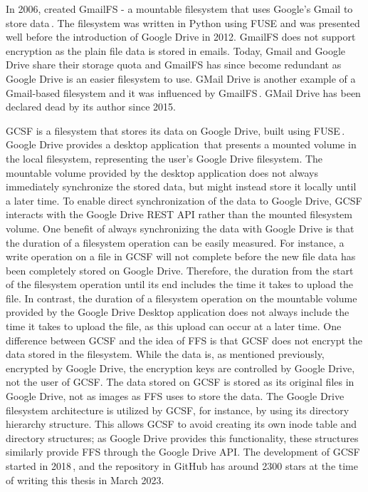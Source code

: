 In 2006, \citeauthor{jonesGoogleHackUse2006} created GmailFS - a mountable filesystem that uses Google's Gmail to store data\,\cite{jonesGoogleHackUse2006, jonesGmailFilesystemImplementation2006}. The filesystem was written in Python using \gls{FUSE} and was presented well before the introduction of Google Drive in 2012. GmailFS does not support encryption as the plain file data is stored in emails. Today, Gmail and Google Drive share their storage quota and GmailFS has since become redundant as Google Drive is an easier filesystem to use. GMail Drive is another example of a \mbox{Gmail-based} filesystem and it was influenced by GmailFS\,\cite{viksoeViksoeDkGMail2004}. GMail Drive has been declared dead by its author since 2015.

\gls{GCSF} is a filesystem that stores its data on Google Drive, built using \gls{FUSE}\,\cite{sergiudanGCSFVirtualFile2018,sergiudanHarababurelGcsf2021}. Google Drive provides a desktop application\,\cite{googleInstallSetGoogle} that presents a mounted volume in the local filesystem, representing the user's Google Drive filesystem. The mountable volume provided by the desktop application does not always immediately synchronize the stored data, but might instead store it locally until a later time. To enable direct synchronization of the data to Google Drive, \gls{GCSF} interacts with the Google Drive REST \gls{API} rather than the mounted filesystem volume. One benefit of always synchronizing the data with Google Drive is that the duration of a filesystem operation can be easily measured. For instance, a write operation on a file in \gls{GCSF} will not complete before the new file data has been completely stored on Google Drive. Therefore, the duration from the start of the filesystem operation until its end includes the time it takes to upload the file. In contrast, the duration of a filesystem operation on the mountable volume provided by the Google Drive Desktop application does not always include the time it takes to upload the file, as this upload can occur at a later time. One difference between \gls{GCSF} and the idea of \gls{FFS} is that \gls{GCSF} does not encrypt the data stored in the filesystem. While the data is, as mentioned previously, encrypted by Google Drive, the encryption keys are controlled by Google Drive, not the user of \gls{GCSF}. The data stored on \gls{GCSF} is stored as its original files in Google Drive, not as images as \gls{FFS} uses to store the data. The Google Drive filesystem architecture is utilized by \gls{GCSF}, for instance, by using its directory hierarchy structure. This allows \gls{GCSF} to avoid creating its own inode table and directory structures; as Google Drive provides this functionality, these structures similarly provide \gls{FFS} through the Google Drive \gls{API}. The development of \gls{GCSF} started in 2018\,\cite{sergiudanHarababurelGcsf2021}, and the repository in GitHub has around \num{2300} stars at the time of writing this thesis in March 2023. 

